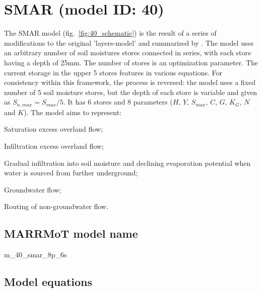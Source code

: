 \section{SMAR (model ID: 40)}
The SMAR model (fig.~\ref{fig:40_schematic}) is the result of a series of modifications to the original 'layers-model' \citep{OConnell1970} and summarized by \citet{Tan1996}. The model uses an arbitrary number of soil moistures stores connected in series, with each store having a depth of 25mm. The number of stores is an optimization parameter. The current storage in the upper 5 stores features in various equations. For consistency within this framework, the process is reversed: the model uses a fixed number of 5 soil moisture stores, but the depth of each store is variable and given as $S_{n,max} = S_{max} / 5$. It has 6 stores and 8 parameters ($H$, $Y$, $S_{max}$, $C$, $G$, $K_G$, $N$ and $K$). The model aims to represent:

\begin{itemizecompact}
\item Saturation excess overland flow;
\item Infiltration excess overland flow;
\item Gradual infiltration into soil moisture and declining evaporation potential when water is sourced from further underground;
\item Groundwater flow;
\item Routing of non-groundwater flow.
\end{itemizecompact}

\subsection{MARRMoT model name}
m\_40\_smar\_8p\_6s \\

\subsection{Model equations}

